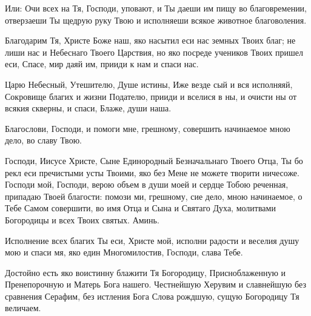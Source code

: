 \itshape 


Или:\normalfont{} Очи всех на Тя, Господи, уповают, и Ты даеши им пищу во благовремении, отверзаеши Ты щедрую руку Твою и исполняеши всякое животное благоволения.


\mychapterending




Благодарим Тя, Христе Боже наш, яко насытил еси нас земных Твоих благ; не лиши нас и Небеснаго Твоего Царствия, но яко посреде учеников Твоих пришел еси, Спасе, мир даяй им, прииди к нам и спаси нас.


\mychapterending





Царю Небесный, Утешителю, Душе истины, Иже везде сый и вся исполняяй, Сокровище благих и жизни Подателю, прииди и вселися в ны, и очисти ны от всякия скверны, и спаси, Блаже, души наша.


    Благослови, Господи, и помоги мне, грешному, совершить начинаемое мною дело, во славу Твою.


    Господи, Иисусе Христе, Сыне Единородный Безначальнаго Твоего Отца, Ты бо рекл еси пречистыми усты Твоими, яко без Мене не можете творити ничесоже. Господи мой, Господи, верою объем в души моей и сердце Тобою реченная, припадаю Твоей благости: помози ми, грешному, сие дело, мною начинаемое, о Тебе Самом совершити, во имя Отца и Сына и Святаго Духа, молитвами Богородицы и всех Твоих святых. Аминь.


\mychapterending





Исполнение всех благих Ты еси, Христе мой, исполни радости и веселия душу мою и спаси мя, яко един Многомилостив, Господи, слава Тебе.


Достойно есть яко воистинну блажити Тя Богородицу, Присноблаженную и Пренепорочную и Матерь Бога нашего. Честнейшую Херувим и славнейшую без сравнения Серафим, без истления Бога Слова рождшую, сущую Богородицу Тя величаем.


\mychapterending




